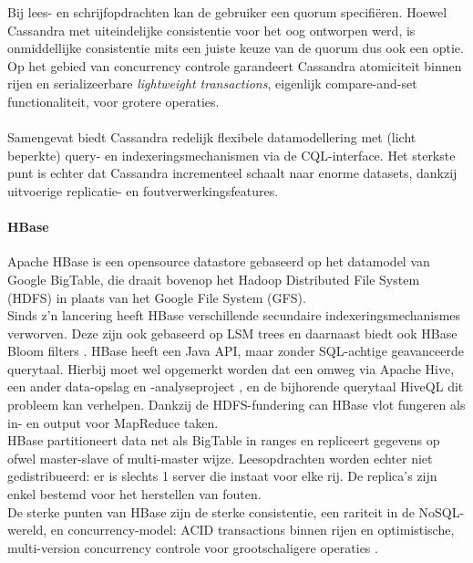 Bij lees- en schrijfopdrachten kan de gebruiker een quorum specifi\"eren. Hoewel Cassandra met uiteindelijke consistentie voor het oog ontworpen werd, is onmiddellijke consistentie mits een juiste keuze van de quorum dus ook een optie.\\
Op het gebied van concurrency controle garandeert Cassandra atomiciteit binnen rijen en serializeerbare \textit{lightweight transactions}, eigenlijk compare-and-set functionaliteit, voor grotere operaties.
\\\\
Samengevat biedt Cassandra redelijk flexibele datamodellering met (licht beperkte) query- en indexeringsmechanismen via de CQL-interface. Het sterkste punt is echter dat Cassandra incrementeel schaalt naar enorme datasets, dankzij uitvoerige replicatie- en foutverwerkingsfeatures.

\paragraph{HBase}

Apache HBase is een opensource datastore gebaseerd op het datamodel van Google BigTable, die draait bovenop het Hadoop Distributed File System (HDFS) in plaats van het Google File System (GFS).\\
Sinds z'n lancering heeft HBase verschillende secundaire indexeringsmechanismes verworven. Deze zijn ook gebaseerd op LSM trees en daarnaast biedt ook HBase Bloom filters \cite{borthakur2011apache}\cite{hbase_schema}. HBase heeft een Java API, maar zonder SQL-achtige geavanceerde querytaal. Hierbij moet wel opgemerkt worden dat een omweg via Apache Hive, een ander data-opslag en -analyseproject \cite{apache_hive}, en de bijhorende querytaal HiveQL dit probleem kan verhelpen. Dankzij de HDFS-fundering can HBase vlot fungeren als in- en output voor MapReduce taken.\\
HBase partitioneert data net als BigTable in ranges en repliceert gegevens op ofwel master-slave of multi-master wijze. Leesopdrachten worden echter niet gedistribueerd: er is slechts 1 server die instaat voor elke rij. De replica's zijn enkel bestemd voor het herstellen van fouten.\\
De sterke punten van HBase zijn de sterke consistentie, een rariteit in de NoSQL-wereld, en concurrency-model: ACID transactions binnen rijen en optimistische, multi-version concurrency controle voor grootschaligere operaties \cite{hbase_acid}\cite{grolinger2013data}\cite{borthakur2011apache}.\\

